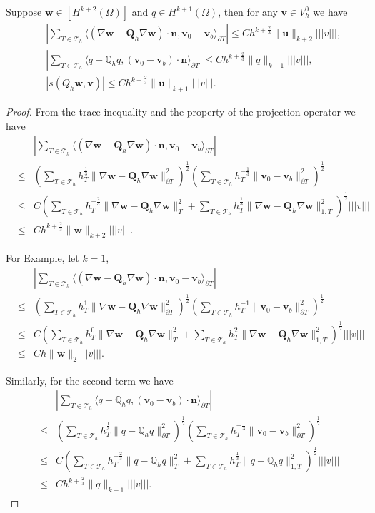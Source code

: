 \documentclass[leqno]{siamltex704}
\numberwithin{equation}{section}
\def\dQ{{\mathbb{Q}}}
\def\bQ{{\mathbf{Q}}}
\def\sumT{\sum_{T\in\mathcal{T}_h}}     %
\def\trb{|\!|\!|}
\def\la{\langle}
\def\ra{\rangle_{\partial T}}
\def\bw{{\mathbf{w}}}
\def\bu{{\mathbf{u}}}
\def\bv{{\mathbf{v}}}
\def\bn{{\mathbf{n}}}
\begin{document}
\begin{lemma}\label{remainder-est}
  Suppose $\bw\in [H^{k+2}(\Omega)]$ and $q\in H^{k+1}(\Omega)$, then for any $\bv\in V_h^0$ we have
  \begin{eqnarray*}
    && \left|\sumT\la (\nabla\bw-\bQ_h\nabla\bw)\cdot\bn,\bv_0-\bv_b\ra\right|\le Ch^{k+\frac23}\|\bu\|_{k+2}\trb v\trb,
    \\
    && \left|\sumT\la q-\dQ_h q,(\bv_0-\bv_b)\cdot\bn\ra\right| \le Ch^{k+\frac23}\|q\|_{k+1}\trb v\trb,
    \\
    && |s(Q_h\bw,\bv)| \le Ch^{k+\frac23}\|\bu\|_{k+1} \trb v\trb.
  \end{eqnarray*}
\end{lemma}
\begin{proof}
  From the trace inequality and the property of the projection operator we have
  \begin{eqnarray*}
    && \left|\sumT\la (\nabla\bw-\bQ_h\nabla\bw)\cdot\bn,\bv_0-\bv_b\ra\right|
    \\
    &\le& \left(\sumT h_T^{\frac13}\|\nabla\bw-\bQ_h\nabla\bw\|_{\partial T}^2\right)^\frac12
    \left(\sumT h_T^{-\frac13}\|\bv_0-\bv_b\|_{\partial T}^2\right)^\frac12
    \\
    &\le& C\left(\sumT h_T^{-\frac23}\|\nabla\bw-\bQ_h\nabla\bw\|_{T}^2 + \sumT h_T^{\frac13}\|\nabla\bw-\bQ_h\nabla\bw\|_{1,T}^2\right)^\frac12\trb v\trb
    \\
    &\le& Ch^{k+\frac23}\|\bw\|_{k+2}\trb v\trb.
  \end{eqnarray*}
  

  {\color{red}
    For Example, let $k=1$,
   \begin{eqnarray*}
    && \left|\sumT\la (\nabla\bw-\bQ_h\nabla\bw)\cdot\bn,\bv_0-\bv_b\ra\right|
    \\
    &\le& \left(\sumT h_T^{1}\|\nabla\bw-\bQ_h\nabla\bw\|_{\partial T}^2\right)^\frac12
    \left(\sumT h_T^{-1}\|\bv_0-\bv_b\|_{\partial T}^2\right)^\frac12
    \\
    &\le& C\left(\sumT h_T^{0}\|\nabla\bw-\bQ_h\nabla\bw\|_{T}^2 + \sumT h_T^{2}\|\nabla\bw-\bQ_h\nabla\bw\|_{1,T}^2\right)^\frac12\trb v\trb
    \\
    &\le& Ch\|\bw\|_{2}\trb v\trb.
  \end{eqnarray*}
  }
  
  Similarly, for the second term we have
  \begin{eqnarray*}
    && \left|\sumT\la q-\dQ_h q,(\bv_0-\bv_b)\cdot\bn\ra\right|
    \\
    &\le& \left(\sumT h_T^{\frac13}\| q-\dQ_h q\|_{\partial T}^2\right)^\frac12
    \left(\sumT h_T^{-\frac13}\|\bv_0-\bv_b\|_{\partial T}^2\right)^\frac12
    \\
    &\le&  C\left(\sumT h_T^{-\frac23}\| q-\dQ_h q\|_{T}^2 + \sumT h_T^{\frac13}\| q-\dQ_h q\|_{1,T}^2\right)^\frac12\trb v\trb
    \\
    &\le& Ch^{k+\frac23}\|q\|_{k+1}\trb v\trb.
  \end{eqnarray*}
  

\end{proof}
\end{document}
